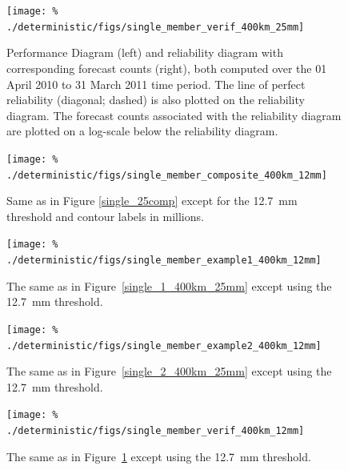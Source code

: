 \clearpage
\begin{figure}[cc]
    \centering
    \texttt{[image: \%
    ./deterministic/figs/single\_member\_verif\_400km\_25mm]}\\
    \caption{Performance Diagram (left) and reliability diagram with corresponding forecast counts (right), both computed over the 01 April 2010 to 31 March 2011 time period.
    The line of perfect reliability (diagonal; dashed) is also plotted on the reliability diagram.
    The forecast counts associated with the reliability diagram are plotted on a log-scale below the reliability diagram.}
    \label{single_verif_400km_25mm}
\end{figure}


\clearpage
\begin{figure}[cc]
    \centering
    \texttt{[image: \%
    ./deterministic/figs/single\_member\_composite\_400km\_12mm]}\\
    \caption{Same as in Figure \ref{single_25comp} except for the \mbox{12.7 mm} threshold and contour labels in millions.}

    \label{single_12comp}
\end{figure}


\clearpage
\begin{figure}[cc]
    \centering
    \texttt{[image: \%
    ./deterministic/figs/single\_member\_example1\_400km\_12mm]}\\
    \caption{The same as in \mbox{Figure \ref{single_1_400km_25mm}} except using the \mbox{12.7 mm} threshold.}
    \label{single_1_400km_12mm}
\end{figure}


\clearpage
\begin{figure}[cc]
    \centering
    \texttt{[image: \%
    ./deterministic/figs/single\_member\_example2\_400km\_12mm]}\\
    \caption{The same as in \mbox{Figure \ref{single_2_400km_25mm}} except using the \mbox{12.7 mm} threshold.}
    \label{single_2_400km_12mm}
\end{figure}


\clearpage
\begin{figure}[cc]
    \centering
    \texttt{[image: \%
    ./deterministic/figs/single\_member\_verif\_400km\_12mm]}\\
    \caption{The same as in \mbox{Figure \ref{single_verif_400km_25mm}} except using the \mbox{12.7 mm} threshold.}
    \label{single_verif_400km_12mm}
\end{figure}





